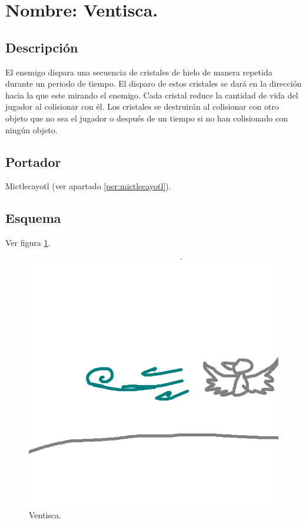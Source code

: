 \section{Nombre: Ventisca.} \label{ventisca}
\subsection{Descripción}
El enemigo dispara una secuencia de cristales de hielo de manera repetida durante un periodo de tiempo. El disparo de estos cristales se dará en la dirección hacia la que este mirando el enemigo. Cada cristal reduce la cantidad de vida del jugador al colisionar con él. Los cristales se destruirán al colisionar con otro objeto que no sea el jugador o después de un tiempo si no han colisionado con ningún objeto.
\subsection{Portador}
Mictlecayotl (ver apartado \ref{per:mictlecayotl}).
\subsection{Esquema}
			Ver figura \ref{fig:ventisca}.
			\begin{figure}
				\centering
				\includegraphics[height=0.2 \textheight]{Imagenes/ventisca}
				\caption{Ventisca.}
				\label{fig:ventisca}
			\end{figure}

